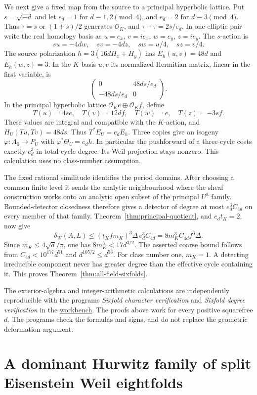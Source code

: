 \documentclass[11pt]{article}
\theoremstyle{definition}
\theoremstyle{remark}
\newcommand{\workbenchurl}{https://github.com/KokunoYumeto/algebraic-cycles-and-motives-workbench}
\begin{document}
We next give a fixed map from the source to a principal hyperbolic lattice. Put $s=\sqrt{-d}$ and let $e_d=1$ for $d\equiv1,2\pmod4$, and $e_d=2$ for $d\equiv3\pmod4$. Thus $\tau=s$ or $(1+s)/2$ generates $\mathcal O_K$, and $\tau-\bar\tau=2s/e_d$. In one elliptic pair write the real homology basis as $u=e_x$, $v=i e_x$, $w=e_y$, $z=i e_y$. The $s$-action is
\[
 su=-4dw,\quad sv=-4dz,\quad sw=u/4,\quad sz=v/4.
\]
The source polarization $h=3(16dH_x+H_y)$ has $E_h(u,v)=48d$ and $E_h(w,z)=3$. In the $K$-basis $u,v$ its normalized Hermitian matrix, linear in the first variable, is
\[
 \begin{pmatrix}0&48ds/e_d\\-48ds/e_d&0\end{pmatrix}.
\]
In the principal hyperbolic lattice $\mathcal O_K e\oplus\mathcal O_K f$, define
\[
 T(u)=4s e,\quad T(v)=12d f,\quad
 T(w)=e,\quad T(z)=-3s f.
\]
These values are integral and compatible with the $K$-action, and $H_U(Tu,Tv)=48ds$. Thus $T^*E_U=e_dE_h$. Three copies give an isogeny $\varphi:A_0\to P_U$ with $\varphi^*\Theta_U=e_dh$. In particular the pushforward of a three-cycle costs exactly $e_d^3$ in total cycle degree. Its Weil projection stays nonzero. This calculation uses no class-number assumption.

The fixed rational similitude identifies the period domains. After choosing a common finite level it sends the analytic neighbourhood where the sheaf construction works onto an analytic open subset of the principal $U^3$ family. Bounded-detector closedness therefore gives a detector of degree at most $e_d^3C_{4d}$ on every member of that family. Theorem~\ref{thm:principal-quotient}, and $e_dt_K=2$, now give
\[
 \delta_W(A,L)\le(t_Kfm_K)^3\Delta\,e_d^3C_{4d}
                 =8m_K^3C_{4d}f^3\Delta.
\]
Since $m_K\le4\sqrt d/\pi$, one has $8m_K^3<17d^{3/2}$. The asserted coarse bound follows from $C_{4d}<10^{177}d^{51}$ and $d^{105/2}\le d^{53}$. For class number one, $m_K=1$. A detecting irreducible component never has greater degree than the effective cycle containing it. This proves Theorem~\ref{thm:all-field-sixfolds}.

The exterior-algebra and integer-arithmetic calculations are independently reproducible with the programs \emph{Sixfold character verification} and \emph{Sixfold degree verification} in the \href{\workbenchurl}{workbench}. The proofs above work for every positive squarefree $d$. The programs check the formulas and signs, and do not replace the geometric deformation argument.
\section{A dominant Hurwitz family of split Eisenstein Weil eightfolds}
\label{sec:eisenstein-hurwitz-dominance}
\end{document}
